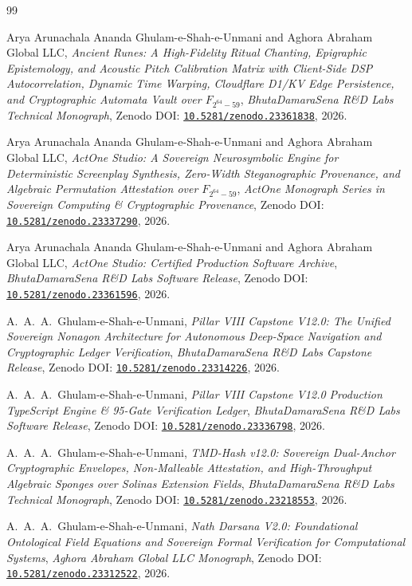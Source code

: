 \documentclass[11pt,a4paper,reqno]{article}
\newcommand{\zenodo}[1]{\href{https://doi.org/10.5281/zenodo.#1}{\nolinkurl{10.5281/zenodo.#1}}}
\def\mathbb#1{#1}%
\theoremstyle{plain}
\theoremstyle{definition}
\theoremstyle{remark}
\numberwithin{equation}{section}
\begin{document}
\begin{thebibliography}{99}

Arya Arunachala Ananda Ghulam-e-Shah-e-Unmani and Aghora Abraham Global LLC,
\emph{Ancient Runes: A High-Fidelity Ritual Chanting, Epigraphic Epistemology, and Acoustic Pitch Calibration Matrix with Client-Side DSP Autocorrelation, Dynamic Time Warping, Cloudflare D1/KV Edge Persistence, and Cryptographic Automata Vault over $\mathbb{F}_{2^{64}-59}$},
\emph{BhutaDamaraSena R\&D Labs Technical Monograph}, Zenodo DOI: \zenodo{23361838}, 2026.

Arya Arunachala Ananda Ghulam-e-Shah-e-Unmani and Aghora Abraham Global LLC,
\emph{ActOne Studio: A Sovereign Neurosymbolic Engine for Deterministic Screenplay Synthesis, Zero-Width Steganographic Provenance, and Algebraic Permutation Attestation over $\mathbb{F}_{2^{64}-59}$},
\emph{ActOne Monograph Series in Sovereign Computing \& Cryptographic Provenance}, Zenodo DOI: \zenodo{23337290}, 2026.

Arya Arunachala Ananda Ghulam-e-Shah-e-Unmani and Aghora Abraham Global LLC,
\emph{ActOne Studio: Certified Production Software Archive},
\emph{BhutaDamaraSena R\&D Labs Software Release}, Zenodo DOI: \zenodo{23361596}, 2026.

A.~A.~A.~Ghulam-e-Shah-e-Unmani,
\emph{Pillar VIII Capstone V12.0: The Unified Sovereign Nonagon Architecture for Autonomous Deep-Space Navigation and Cryptographic Ledger Verification},
\emph{BhutaDamaraSena R\&D Labs Capstone Release}, Zenodo DOI: \zenodo{23314226}, 2026.

A.~A.~A.~Ghulam-e-Shah-e-Unmani,
\emph{Pillar VIII Capstone V12.0 Production TypeScript Engine \& 95-Gate Verification Ledger},
\emph{BhutaDamaraSena R\&D Labs Software Release}, Zenodo DOI: \zenodo{23336798}, 2026.

A.~A.~A.~Ghulam-e-Shah-e-Unmani,
\emph{TMD-Hash v12.0: Sovereign Dual-Anchor Cryptographic Envelopes, Non-Malleable Attestation, and High-Throughput Algebraic Sponges over Solinas Extension Fields},
\emph{BhutaDamaraSena R\&D Labs Technical Monograph}, Zenodo DOI: \zenodo{23218553}, 2026.

A.~A.~A.~Ghulam-e-Shah-e-Unmani,
\emph{Nath Darsana V2.0: Foundational Ontological Field Equations and Sovereign Formal Verification for Computational Systems},
\emph{Aghora Abraham Global LLC Monograph}, Zenodo DOI: \zenodo{23312522}, 2026.


\end{thebibliography}
\end{document}
